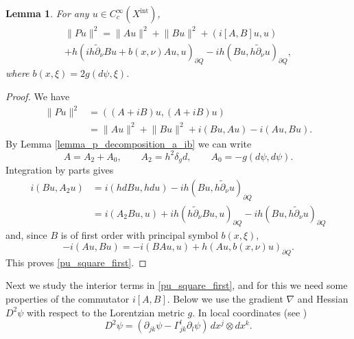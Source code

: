 \documentclass[11pt,letterpaper]{amsart}
\newtheorem{Lemma}[Theorem]{Lemma}
\theoremstyle{definition}
\numberwithin{equation}{section}
\newcommand{\norm}[1]{\lVert #1 \rVert}         %
\newcommand{\p}{\partial}
\def\p{\partial}
\begin{document}
\begin{Lemma}
For any $u \in C^{\infty}_c(X^{\mathrm{int}})$, 
\begin{multline} \label{pu_square_first}
\norm{Pu}^2 = \norm{Au}^2 + \norm{Bu}^2 + ( i [A, B] u, u ) \\
 + h (i h\tilde{\p}_{\nu} Bu + b(x,\nu) Au, u)_{\p Q} - ih(Bu, h \tilde{\p}_{\nu} u)_{\p Q},
\end{multline}
where $b(x,\xi) = 2 g(d\psi, \xi)$.
\end{Lemma}
\begin{proof}
We have 
\begin{align*}
\norm{Pu}^2 &= ((A+iB)u, (A+iB)u) \\
 &= \norm{Au}^2 + \norm{Bu}^2 + i (Bu, Au) - i (Au, Bu).
\end{align*}
By Lemma \ref{lemma_p_decomposition_a_ib} we can write 
\[
A = A_2 + A_0, \qquad A_2 = h^2 \delta_g d, \qquad A_0 = -g(d\psi,d\psi).
\]
Integration by parts gives 
\begin{align*}
i(Bu, A_2 u) &= i(hdBu, hdu) - ih(Bu, h \tilde{\p}_{\nu} u)_{\p Q} \\
 &= i(A_2 Bu, u) + ih (h\tilde{\p}_{\nu} Bu, u)_{\p Q} - ih(Bu, h \tilde{\p}_{\nu} u)_{\p Q}
\end{align*}
and, since $B$ is of first order with principal symbol $b(x,\xi)$,  
\[
-i(Au, Bu) = -i(BAu, u) + h (Au, b(x,\nu) u)_{\p Q}.
\]
This proves \eqref{pu_square_first}.
\end{proof}


Next we study the interior terms in \eqref{pu_square_first}, and for this we need some properties of the commutator $i[A, B]$. Below we use the gradient $\nabla$ and Hessian $D^2 \psi$ with respect to the Lorentzian metric $g$. In local coordinates (see \cite{oneill1983})
\[
D^2 \psi = (\p_{jk} \psi - \Gamma_{jk}^l \p_l \psi) \,dx^j \otimes dx^k.
\]
\end{document}

